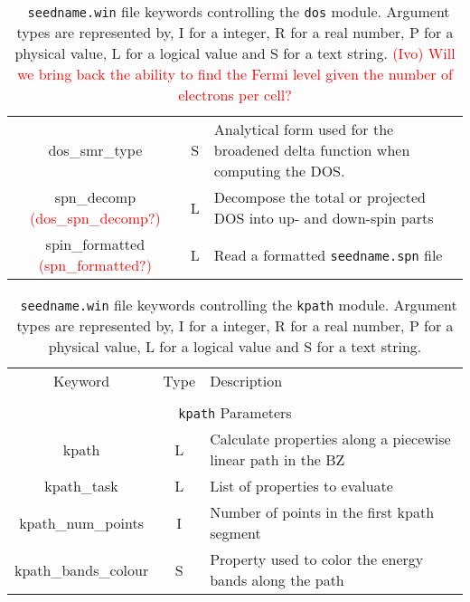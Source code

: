\begin{table}[hH!]
\begin{center}
\begin{tabular}{|c|c|p{6cm}|}
  {\sc dos\_smr\_type} & S & Analytical form used for the broadened delta function
  when computing the DOS. \\
  {\sc spn\_decomp} \textcolor{red}{({\sc dos\_spn\_decomp}?)}& L & 
Decompose the total or projected DOS into up- and down-spin parts\\
  {\sc spin\_formatted} \textcolor{red}{({\sc spn\_formatted}?)}& L & 
  Read a formatted {\tt seedname.spn} file\\
  \hline
\end{tabular}
\caption[Parameter file keywords controlling the DOS module.]  {{\tt
    seedname.win} file keywords controlling the {\tt dos}
  module. Argument types are represented by, I for a integer, R for a
  real number, P for a physical value, L for a logical value and S for
  a text string.  \textcolor{red}{(Ivo) Will we bring back the ability
    to find the Fermi level given the number of electrons per cell?}
}
\label{parameter_keywords_dos}
\end{center}
\end{table}


\begin{table}[hH!]
\begin{center}
\begin{tabular}{|c|c|p{6cm}|}
  \hline
  Keyword & Type & Description \\
  &      &             \\
  \hline\hline
  \multicolumn{3}{|c|}{{\tt kpath} Parameters} \\
  \hline
  {\sc kpath}  & L & Calculate properties along a piecewise linear path in the BZ \\
  {\sc kpath\_task}& L & List of properties to evaluate\\
  {\sc kpath\_num\_points}& I & Number of points in the first kpath segment\\
  {\sc kpath\_bands\_colour}& S & Property used to color the energy bands along the path\\
  \hline
\end{tabular}
\caption[Parameter file keywords controlling the kpath module.]  {{\tt
    seedname.win} file keywords controlling the {\tt kpath}
  module. Argument types are represented by, I for a integer, R for a
  real number, P for a physical value, L for a logical value and S for
  a text string.}
\label{parameter_keywords_kpath}
\end{center}
\end{table}


